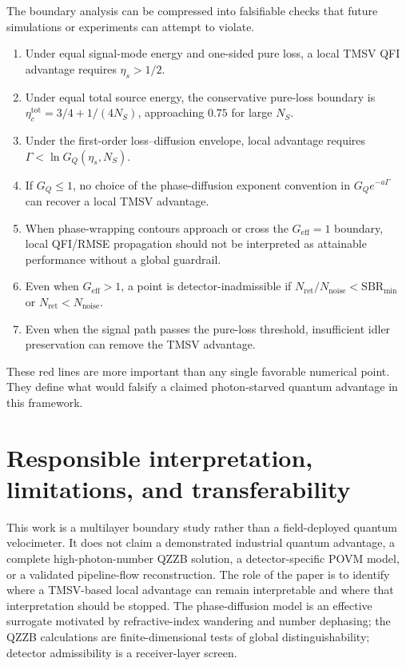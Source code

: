 \documentclass[a4paper,11pt]{article}
\numberwithin{equation}{section}
\newcommand{\Nret}{N_{\mathrm{ret}}}
\newcommand{\Ns}{N_{S}}
\newcommand{\etas}{\eta_s}
\newcommand{\GQ}{G_Q}
\newcommand{\Geff}{G_{\mathrm{eff}}}
\newcommand{\SBR}{\mathrm{SBR}}
\begin{document}
The boundary analysis can be compressed into falsifiable checks that future simulations or experiments can attempt to violate.
\begin{enumerate}[label=(\alph*)]
  \item Under equal signal-mode energy and one-sided pure loss, a local TMSV QFI advantage requires $\etas>1/2$.
  \item Under equal total source energy, the conservative pure-loss boundary is $\eta_c^{\mathrm{tot}}=3/4+1/(4\Ns)$, approaching $0.75$ for large $\Ns$.
  \item Under the first-order loss--diffusion envelope, local advantage requires $\Gamma<\ln \GQ(\etas,\Ns)$.
  \item If $\GQ\le1$, no choice of the phase-diffusion exponent convention in $\GQ e^{-a\Gamma}$ can recover a local TMSV advantage.
  \item When phase-wrapping contours approach or cross the $\Geff=1$ boundary, local QFI/RMSE propagation should not be interpreted as attainable performance without a global guardrail.
  \item Even when $\Geff>1$, a point is detector-inadmissible if $\Nret/N_{\mathrm{noise}}<\SBR_{\min}$ or $\Nret<N_{\mathrm{noise}}$.
  \item Even when the signal path passes the pure-loss threshold, insufficient idler preservation can remove the TMSV advantage.
\end{enumerate}
These red lines are more important than any single favorable numerical point. They define what would falsify a claimed photon-starved quantum advantage in this framework.

\section{Responsible interpretation, limitations, and transferability}
\label{sec:limitations}

This work is a multilayer boundary study rather than a field-deployed quantum velocimeter. It does not claim a demonstrated industrial quantum advantage, a complete high-photon-number QZZB solution, a detector-specific POVM model, or a validated pipeline-flow reconstruction. The role of the paper is to identify where a TMSV-based local advantage can remain interpretable and where that interpretation should be stopped. The phase-diffusion model is an effective surrogate motivated by refractive-index wandering and number dephasing; the QZZB calculations are finite-dimensional tests of global distinguishability; detector admissibility is a receiver-layer screen.
\end{document}
